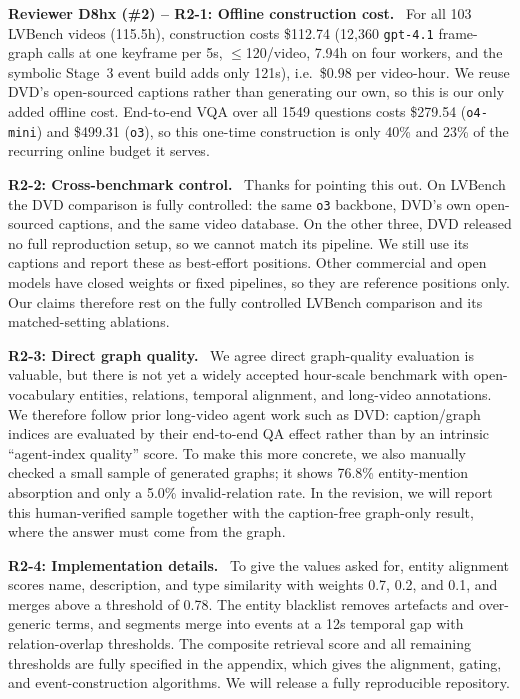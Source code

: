 \documentclass[10pt,twocolumn]{article}
\newcommand{\rvcolor}{rvR1}
\newcommand{\pt}[1]{\textbf{\textcolor{\rvcolor}{#1}}\ }
\newcommand{\rv}[1]{\vspace{1.5pt}\pt{#1}}
\begin{document}
\renewcommand{\rvcolor}{rvR2}%
\rv{Reviewer D8hx (\#2) -- R2-1: Offline construction cost.} For all 103 LVBench
videos (115.5h), construction costs \$112.74 (12,360 \texttt{gpt-4.1} frame-graph
calls at one keyframe per 5s, $\le$120/video, 7.94h on four workers, and the symbolic
Stage~3 event build adds only 121s), i.e.\ \$0.98 per video-hour. We reuse DVD's open-sourced captions rather than
generating our own, so this is our only added offline cost. End-to-end VQA over all 1549 questions costs \$279.54
(\texttt{o4-mini}) and \$499.31 (\texttt{o3}), so this one-time construction is
only 40\% and 23\% of the recurring online budget it serves.

\pt{R2-2: Cross-benchmark control.} Thanks for pointing this out. On
LVBench the DVD comparison is fully controlled: the same \texttt{o3}
backbone, DVD's own open-sourced captions, and the same video database. On the
other three, DVD released no full reproduction setup, so we cannot match its
pipeline. We still use its captions and report these as best-effort positions.
Other commercial and open models have closed weights or fixed pipelines, so they are reference
positions only. Our claims therefore rest on the fully controlled LVBench comparison and its matched-setting
ablations.

\pt{R2-3: Direct graph quality.} We agree direct graph-quality evaluation is
valuable, but there is not yet a widely accepted hour-scale benchmark with
open-vocabulary entities, relations, temporal alignment, and long-video
annotations. We therefore follow prior long-video agent work such as DVD:
caption/graph indices are evaluated by their end-to-end QA effect rather than
by an intrinsic ``agent-index quality'' score. To make this more concrete, we
also manually checked a small sample of generated graphs; it shows 76.8\%
entity-mention absorption and only a 5.0\% invalid-relation rate. In the
revision, we will report this human-verified sample together with the
caption-free graph-only result, where the answer must come from the graph.

\pt{R2-4: Implementation details.} To give the values asked for, entity alignment
scores name, description, and type similarity with weights 0.7, 0.2, and 0.1, and
merges above a threshold of 0.78. The entity blacklist removes artefacts and
over-generic terms, and segments merge into events at a 12s temporal gap with
relation-overlap thresholds. The composite retrieval score and all remaining thresholds are fully specified in
the appendix, which gives the alignment, gating, and event-construction
algorithms. We will release a fully reproducible repository.
\end{document}
